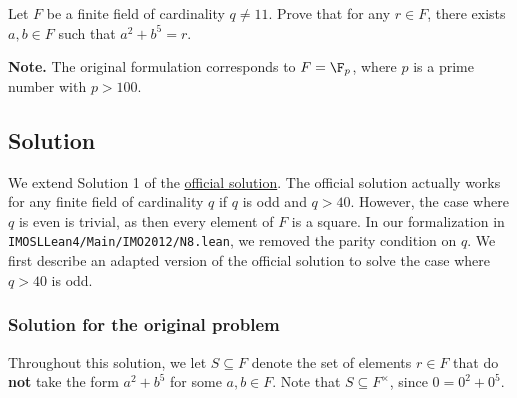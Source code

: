 Let $F$ be a finite field of cardinality $q \neq 11$.
Prove that for any $r \in F$, there exists $a, b \in F$ such that $a^2 + b^5 = r$.

\textbf{Note.}
The original formulation corresponds to $F = \F_p$, where $p$ is a prime number with $p > 100$.



\subsection*{Solution}

We extend Solution 1 of the \href{https://www.imo-official.org/problems/IMO2012SL.pdf}{official solution}.
The official solution actually works for any finite field of cardinality $q$ if $q$ is odd and $q > 40$.
However, the case where $q$ is even is trivial, as then every element of $F$ is a square.
In our formalization in \texttt{IMOSLLean4/Main/IMO2012/N8.lean}, we removed the parity condition on $q$.
We first describe an adapted version of the official solution to solve the case where $q > 40$ is odd.



\subsubsection*{Solution for the original problem}

Throughout this solution, we let $S \subseteq F$ denote the set of elements $r \in F$ that do \textbf{not} take the form $a^2 + b^5$ for some $a, b \in F$.
Note that $S \subseteq F^{\times}$, since $0 = 0^2 + 0^5$.


